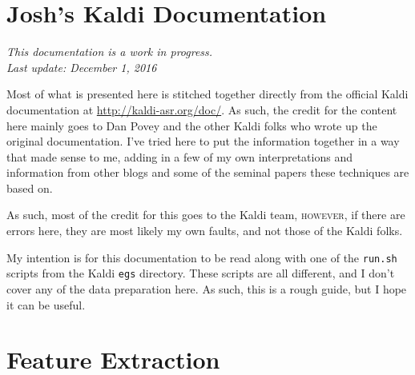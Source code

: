 \documentclass[10pt,a4paper]{article}
\begin{document}
\section*{\Large{Josh's Kaldi Documentation}}

\vspace{.25cm}

\begin{center}
\textit{This documentation is a work in progress.}\\
\textit{Last update: December 1, 2016}\\
\end{center}

\vspace{.25cm}

Most of what is presented here is stitched together directly from the official Kaldi documentation at \href{http://kaldi-asr.org/doc/}{http://kaldi-asr.org/doc/}. As such, the credit for the content here mainly goes to Dan Povey and the other Kaldi folks who wrote up the original documentation. I've tried here to put the information together in a way that made sense to me, adding in a few of my own interpretations and information from other blogs and some of the seminal papers these techniques are based on.  

As such, most of the credit for this goes to the Kaldi team, \textsc{however}, if there are errors here, they are most likely my own faults, and not those of the Kaldi folks.

My intention is for this documentation to be read along with one of the \texttt{run.sh} scripts from the Kaldi \texttt{egs} directory. These scripts are all different, and I don't cover any of the data preparation here. As such, this is a rough guide, but I hope it can be useful.

\vspace{1cm}

\section*{\large{Feature Extraction}}
\end{document}
